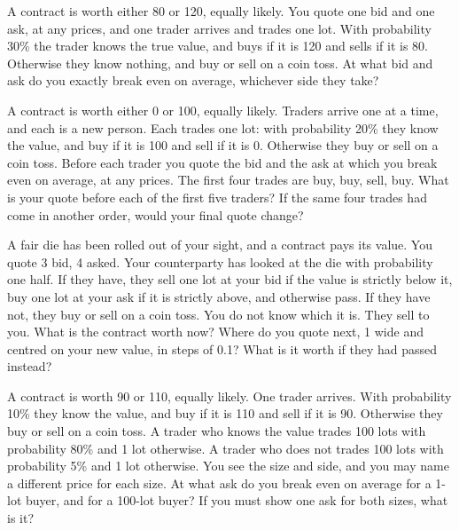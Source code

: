 \begin{question}\label{iq:iv2:making-a-market:12}
A contract is worth either 80 or 120, equally likely. You quote one bid and one ask, at any prices, and one trader arrives and trades one lot. With probability 30\% the trader knows the true value, and buys if it is 120 and sells if it is 80. Otherwise they know nothing, and buy or sell on a coin toss. At what bid and ask do you exactly break even on average, whichever side they take?
\end{question}

\begin{question}\label{iq:iv2:making-a-market:13}
A contract is worth either 0 or 100, equally likely. Traders arrive one at a time, and each is a new person. Each trades one lot: with probability 20\% they know the value, and buy if it is 100 and sell if it is 0. Otherwise they buy or sell on a coin toss. Before each trader you quote the bid and the ask at which you break even on average, at any prices. The first four trades are buy, buy, sell, buy. What is your quote before each of the first five traders? If the same four trades had come in another order, would your final quote change?
\end{question}

\begin{question}\label{iq:iv2:making-a-market:14}
A fair die has been rolled out of your sight, and a contract pays its value. You quote 3 bid, 4 asked. Your counterparty has looked at the die with probability one half. If they have, they sell one lot at your bid if the value is strictly below it, buy one lot at your ask if it is strictly above, and otherwise pass. If they have not, they buy or sell on a coin toss. You do not know which it is. They sell to you. What is the contract worth now? Where do you quote next, 1 wide and centred on your new value, in steps of 0.1? What is it worth if they had passed instead?
\end{question}

\begin{question}\label{iq:iv2:making-a-market:15}
A contract is worth 90 or 110, equally likely. One trader arrives. With probability 10\% they know the value, and buy if it is 110 and sell if it is 90. Otherwise they buy or sell on a coin toss. A trader who knows the value trades 100 lots with probability 80\% and 1 lot otherwise. A trader who does not trades 100 lots with probability 5\% and 1 lot otherwise. You see the size and side, and you may name a different price for each size. At what ask do you break even on average for a 1-lot buyer, and for a 100-lot buyer? If you must show one ask for both sizes, what is it?
\end{question}

